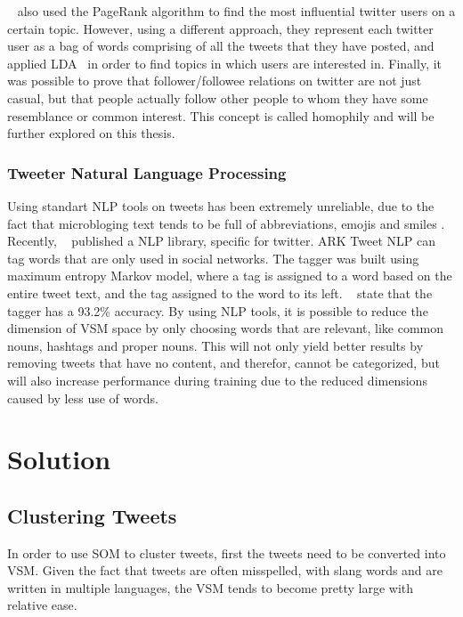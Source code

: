 \documentclass[journal]{IEEEtran}
\begin{document}
~\citet{Weng2010} also used the PageRank algorithm to find the most influential twitter users on a certain topic. However, using a different approach, they represent each twitter user as a bag of words comprising of all the tweets that they have posted, and applied \ac{LDA}~\cite{Blei2003} in order to find topics in which users are interested in. Finally, it was possible to prove that follower/followee relations on twitter are not just casual, but that people actually follow other people to whom they have some resemblance or common interest. This concept is called homophily and will be further explored on this thesis.
                                                                                                          \subsubsection{Tweeter Natural Language Processing}
\label{sub:tweeter_natural_language_processing}
Using standart \ac{NLP} tools on tweets has been extremely unreliable, due to the fact that microbloging text tends to be full of abbreviations, emojis and smiles . Recently, ~\citet{owoputi13improvedparth} published a \ac{NLP} library, specific for twitter. ARK Tweet \ac{NLP} can tag words that are only used in social networks. The tagger was built using maximum entropy Markov model, where a tag is assigned to a word based on the entire tweet text, and the tag assigned to the word to its left. ~\citet{owoputi13improvedparth} state that the tagger has a 93.2\% accuracy. 
By using \ac{NLP} tools, it is possible to reduce the dimension of \ac{VSM} space by only choosing words that are relevant, like common nouns, hashtags and proper nouns. This will not only yield better results by removing tweets that have no content, and therefor, cannot be categorized, but will also increase performance during training due to the reduced dimensions caused by less use of words.
 
\section{Solution}
\label{sec:solution}


\subsection{Clustering Tweets}
\label{sub:clustering_tweets}

In order to use \ac{SOM} to cluster tweets, first the tweets need to be converted into \ac{VSM}. Given the fact that tweets are often misspelled, with slang words and are written in multiple languages, the \ac{VSM} tends to become pretty large with relative ease. 
\end{document}
